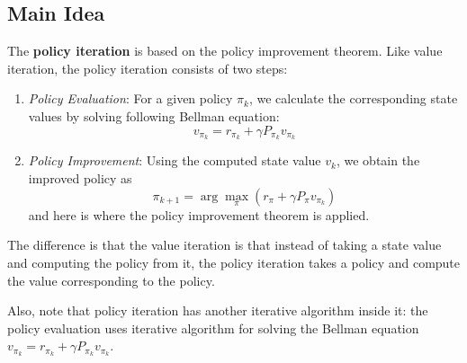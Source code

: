    \subsection{Main Idea}
        The \textbf{policy iteration} is based on the policy improvement theorem. 
        Like value iteration, the policy iteration consists of two steps:
        \begin{enumerate}
            \item \emph{Policy Evaluation}: For a given policy $\pi_k$, we calculate the corresponding state values by solving following Bellman equation:
                \begin{equation}
                    v_{\pi_k} = r_{\pi_k} + \gamma P_{\pi_k}v_{\pi_k}
                \end{equation}
            \item \emph{Policy Improvement}: Using the computed state value $v_k$, we obtain the improved policy as
                \begin{equation}
                    \pi_{k+1} = \arg\max_\pi(r_\pi + \gamma P_\pi v_{\pi_k})
                \end{equation} and here is where the policy improvement theorem is applied.
        \end{enumerate}
        The difference is that the value iteration is that instead of taking a state value and computing the policy from it,
        the policy iteration takes a policy and compute the value corresponding to the policy.

        Also, note that policy iteration has another iterative algorithm inside it: the policy evaluation uses iterative algorithm for solving the
        Bellman equation $v_{\pi_k} = r_{\pi_k} + \gamma P_{\pi_k}v_{\pi_k}$.
